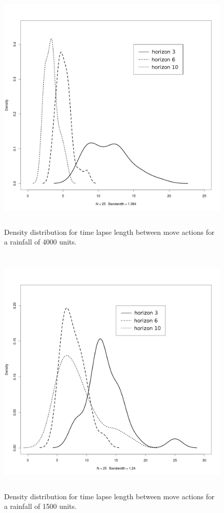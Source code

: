 \documentclass[11pt,oneside,a4paper,openright]{report}
\begin{document}
\begin{figure}[!htb]
\centering
\includegraphics[height=12.2cm]{figures/expm/segmLength_clim4000_begin320}
\caption{Density distribution for time lapse length between move actions for a rainfall of 4000 units.}
\label{fig:segmLength_clim4000_begin320}
\end{figure}

\begin{figure}[!htb]
\centering
\includegraphics[height=12.2cm]{figures/expm/segmLength_clim1500_begin320}
\caption{Density distribution for time lapse length between move actions for a rainfall of 1500 units.}
\label{fig:segmLength_clim1500_begin320}
\end{figure}
\end{document}
